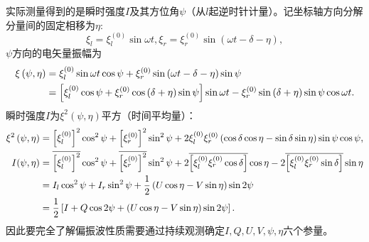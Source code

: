 \documentclass[../天体物理基础.tex]{subfiles}
\begin{document}
实际测量得到的是瞬时强度$I$及其方位角$\psi$（从$l$起逆时针计量）。记坐标轴方向分解分量间的固定相移为$\eta$:
\begin{equation}
\xi_l=\xi_l^{\left(0\right)}\sin\omega t,\xi_r=\xi_r^{\left(0\right)}\sin\left(\omega t-\delta-\eta\right),
\end{equation}
$\psi$方向的电矢量振幅为
\begin{align}
\xi\left(\psi,\eta\right)&=\xi_l^{\left(0\right)}\sin\omega t\cos\psi+\xi_r^{\left(0\right)}\sin\left(\omega t-\delta-\eta\right)\sin\psi\notag\\
&=\left[\xi_l^{\left(0\right)}\cos\psi+\xi_r^{\left(0\right)}\cos\left(\delta+\eta\right)\sin\psi\right]\sin\omega t-\xi_r^{\left(0\right)}\sin\left(\delta+\eta\right)\sin\psi\cos\omega t.
\end{align}
瞬时强度$I$为$\xi^{2}\left(\psi,\eta\right)$平方（时间平均量）：
\begin{align}
\xi^2\left(\psi,\eta\right)&=\left[\xi_l^{\left(0\right)}\right]^2\cos^2\psi+\left[\xi_r^{\left(0\right)}\right]^2\sin^2\psi+2\xi_l^{\left(0\right)}\xi_r^{\left(0\right)}\left(\cos\delta\cos\eta-\sin\delta\sin\eta\right)\sin\psi\cos\psi,\\
I(\psi,\eta)&=\overline{\left[\xi_l^{\left(0\right)}\right]^2}\cos^2\psi+\overline{\left[\xi_r^{\left(0\right)}\right]^2}\sin^2\psi+2\overline{\left[\xi_l^{\left(0\right)}\xi_r^{\left(0\right)}\cos\delta\right]}\cos\eta-2\overline{\left[\xi_l^{\left(0\right)}\xi_r^{\left(0\right)}\sin\delta\right]}\sin\eta\notag\\
&=I_l\cos^2\psi+I_r\sin^2\psi+\frac12\left(U\cos\eta-V\sin\eta\right)\sin2\psi\notag\\
&=\frac12\left[I+Q\cos2\psi+\left(U\cos\eta-V\sin\eta\right)\sin2\psi\right].
\end{align}
因此要完全了解偏振波性质需要通过持续观测确定$I,Q,U,V,\psi,\eta$六个参量。
\end{document}
